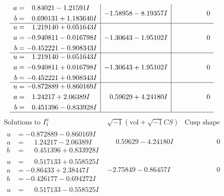 \documentclass[1p]{elsarticle_modified}
\theoremstyle{definition}
\newcommand{\I}{\sqrt{-1}}
\begin{document}
$$\begin{array}{c|c|c}
\begin{aligned}
a &= \phantom{-}0.84021 - 1.21591 I \\
b &= \phantom{-}0.690131 + 1.183640 I\end{aligned}
 & -1.58958 - 8.19357 I & \phantom{-0.000000 } 0 \\ \hline\begin{aligned}
u &= \phantom{-}1.219140 + 0.051643 I \\
a &= -0.940811 - 0.016798 I \\
b &= -0.452221 - 0.908343 I\end{aligned}
 & -1.30643 - 1.95102 I & \phantom{-0.000000 } 0 \\ \hline\begin{aligned}
u &= \phantom{-}1.219140 - 0.051643 I \\
a &= -0.940811 + 0.016798 I \\
b &= -0.452221 + 0.908343 I\end{aligned}
 & -1.30643 + 1.95102 I & \phantom{-0.000000 } 0 \\ \hline\begin{aligned}
u &= -0.872889 + 0.860169 I \\
a &= \phantom{-}1.24217 + 2.06389 I \\
b &= \phantom{-}0.451396 - 0.833928 I\end{aligned}
 & \phantom{-}0.59629 + 4.24180 I & \phantom{-0.000000 } 0\\
 \hline 
 \end{array}$$\newpage$$\begin{array}{c|c|c}  
\text{Solutions to }I^u_{1}& \I (\text{vol} + \sqrt{-1}CS) & \text{Cusp shape}\\
 \hline 
\begin{aligned}
u &= -0.872889 - 0.860169 I \\
a &= \phantom{-}1.24217 - 2.06389 I \\
b &= \phantom{-}0.451396 + 0.833928 I\end{aligned}
 & \phantom{-}0.59629 - 4.24180 I & \phantom{-0.000000 } 0 \\ \hline\begin{aligned}
u &= \phantom{-}0.517133 + 0.558525 I \\
a &= -0.86433 + 2.38447 I \\
b &= -0.426177 - 0.694272 I\end{aligned}
 & -2.75849 - 0.86457 I & \phantom{-0.000000 } 0 \\ \hline\begin{aligned}
u &= \phantom{-}0.517133 - 0.558525 I \\

\end{aligned}
\end{array}$$
\end{document}
